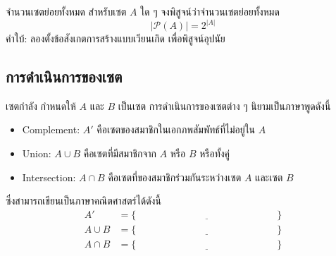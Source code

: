 \newpage
\begin{exer}
	{จำนวนเซตย่อยทั้งหมด}{}
	สำหรับเซต $A$ ใด ๆ จงพิสูจน์ว่าจำนวนเซตย่อยทั้งหมด
	$$
	|\mathcal{P}(A)| = 2^{|A|}
	$$
	คำใบ้: ลองตั้งข้อสังเกตการสร้างแบบเวียนเกิด เพื่อพิสูจน์อุปนัย
\end{exer}

\newpage
\subsection{การดำเนินการของเซต}
\begin{defn}{เซตกำลัง}{}
	กำหนดให้ $A$ และ $B$ เป็นเซต การดำเนินการของเซตต่าง ๆ นิยามเป็นภาษาพูดดังนี้
	\begin{itemize}
		\item Complement: $A'$ คือเซตของสมาชิกในเอกภพสัมพัทธ์ที่ไม่อยู่ใน $A$
		\item Union: $A \cup B$ คือเซตที่มีสมาชิกจาก $A$ หรือ $B$ หรือทั้งคู่
		\item Intersection: $A\cap B$ คือเซตที่ของสมาชิกร่วมกันระหว่างเซต $A$ และเซต $B$
	\end{itemize}
	ซึ่งสามารถเขียนเป็นภาษาคณิตศาสตร์ได้ดังนี้
	\begin{align*}
		A' &= \{\underline{\hspace{6cm}}\}\\
		A\cup B &= \{\underline{\hspace{6cm}}\}\\
		A\cap B &= \{\underline{\hspace{6cm}}\}
	\end{align*}
\end{defn}

